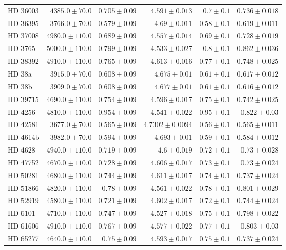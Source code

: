 \begin{longtable*}{lrrrrr}
HD 36003 & $4385.0\pm 70.0$ & $0.705\pm 0.09$ & $4.591\pm 0.013$ & $0.7\pm 0.1$ & $0.736\pm 0.018$ \\ 
HD 36395 & $3766.0\pm 70.0$ & $0.579\pm 0.09$ & $4.69\pm 0.011$ & $0.58\pm 0.1$ & $0.619\pm 0.011$ \\ 
HD 37008 & $4980.0\pm 110.0$ & $0.689\pm 0.09$ & $4.557\pm 0.014$ & $0.69\pm 0.1$ & $0.728\pm 0.019$ \\ 
HD 3765 & $5000.0\pm 110.0$ & $0.799\pm 0.09$ & $4.533\pm 0.027$ & $0.8\pm 0.1$ & $0.862\pm 0.036$ \\ 
HD 38392 & $4910.0\pm 110.0$ & $0.765\pm 0.09$ & $4.613\pm 0.016$ & $0.77\pm 0.1$ & $0.748\pm 0.025$ \\ 
HD 38a & $3915.0\pm 70.0$ & $0.608\pm 0.09$ & $4.675\pm 0.01$ & $0.61\pm 0.1$ & $0.617\pm 0.012$ \\ 
HD 38b & $3909.0\pm 70.0$ & $0.608\pm 0.09$ & $4.677\pm 0.01$ & $0.61\pm 0.1$ & $0.616\pm 0.012$ \\ 
HD 39715 & $4690.0\pm 110.0$ & $0.754\pm 0.09$ & $4.596\pm 0.017$ & $0.75\pm 0.1$ & $0.742\pm 0.025$ \\ 
HD 4256 & $4810.0\pm 110.0$ & $0.954\pm 0.09$ & $4.541\pm 0.022$ & $0.95\pm 0.1$ & $0.822\pm 0.03$ \\ 
HD 42581 & $3677.0\pm 70.0$ & $0.565\pm 0.09$ & $4.7302\pm 0.0094$ & $0.56\pm 0.1$ & $0.565\pm 0.011$ \\ 
HD 4614b & $3982.0\pm 70.0$ & $0.594\pm 0.09$ & $4.693\pm 0.01$ & $0.59\pm 0.1$ & $0.584\pm 0.012$ \\ 
HD 4628 & $4940.0\pm 110.0$ & $0.719\pm 0.09$ & $4.6\pm 0.019$ & $0.72\pm 0.1$ & $0.73\pm 0.028$ \\ 
HD 47752 & $4670.0\pm 110.0$ & $0.728\pm 0.09$ & $4.606\pm 0.017$ & $0.73\pm 0.1$ & $0.73\pm 0.024$ \\ 
HD 50281 & $4680.0\pm 110.0$ & $0.744\pm 0.09$ & $4.611\pm 0.017$ & $0.74\pm 0.1$ & $0.737\pm 0.024$ \\ 
HD 51866 & $4820.0\pm 110.0$ & $0.78\pm 0.09$ & $4.561\pm 0.022$ & $0.78\pm 0.1$ & $0.801\pm 0.029$ \\ 
HD 52919 & $4580.0\pm 110.0$ & $0.721\pm 0.09$ & $4.602\pm 0.017$ & $0.72\pm 0.1$ & $0.744\pm 0.024$ \\ 
HD 6101 & $4710.0\pm 110.0$ & $0.747\pm 0.09$ & $4.527\pm 0.018$ & $0.75\pm 0.1$ & $0.798\pm 0.022$ \\ 
HD 61606 & $4910.0\pm 110.0$ & $0.767\pm 0.09$ & $4.577\pm 0.022$ & $0.77\pm 0.1$ & $0.803\pm 0.03$ \\ 
HD 65277 & $4640.0\pm 110.0$ & $0.75\pm 0.09$ & $4.593\pm 0.017$ & $0.75\pm 0.1$ & $0.737\pm 0.024$ \\ 

\end{longtable*}

